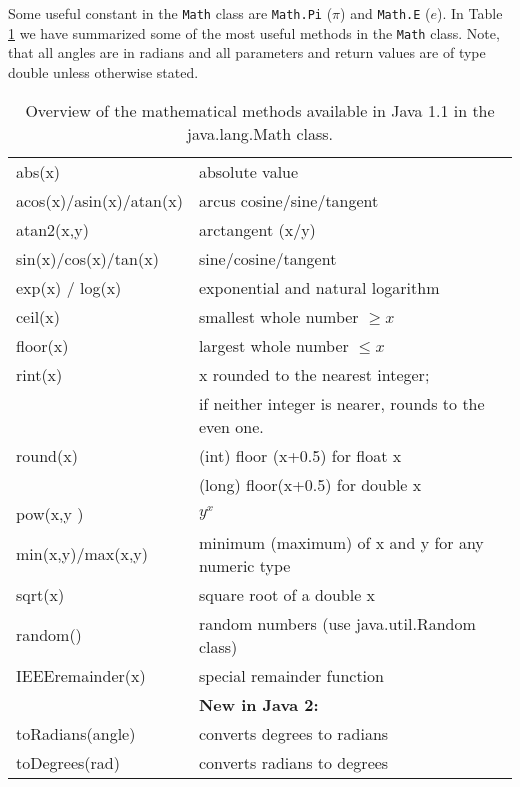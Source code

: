 Some useful constant in the \verb|Math| class  are \verb|Math.Pi|
($\pi$) and \verb|Math.E| ($e$).
In Table \ref{tab:math_table} 
we have summarized some of the most useful methods in the \verb|Math| class. 
Note, that all angles are in radians and all parameters and
return values are of type double unless otherwise stated. 
\begin{table}[htbp]
  \begin{center}
    \leavevmode
    \begin{tabular}{ll}
      abs(x) & absolute value \\
      acos(x)/asin(x)/atan(x) & arcus cosine/sine/tangent \\
      atan2(x,y) & arctangent (x/y)  \\
      sin(x)/cos(x)/tan(x) & sine/cosine/tangent\\
      exp(x) / log(x) & exponential and natural logarithm \\
      ceil(x) & smallest whole number $\ge x$ \\
      floor(x) & largest whole number $\le x$ \\
      rint(x) & x rounded to the nearest integer; \\
             &  if neither integer is
                        nearer, rounds to the even one. \\
      round(x) & (int) floor (x+0.5) for float x \\
       ~       & (long) floor(x+0.5) for double x \\
      pow(x,y ) & $y^x$\\
      min(x,y)/max(x,y)  & minimum (maximum)  of x and y for any numeric type  \\
      sqrt(x) & square root of a double x\\
      random() & random numbers (use java.util.Random class)\\
      IEEEremainder(x) & special remainder function \\\hline
      & \textbf{New in Java 2:} \\
      toRadians(angle) & converts degrees to radians\\
      toDegrees(rad) & converts radians to degrees \
    \end{tabular}
    \caption{Overview of the mathematical 
      methods available in Java 1.1 in the java.lang.Math class.}
    \label{tab:math_table}
  \end{center}
\end{table}

